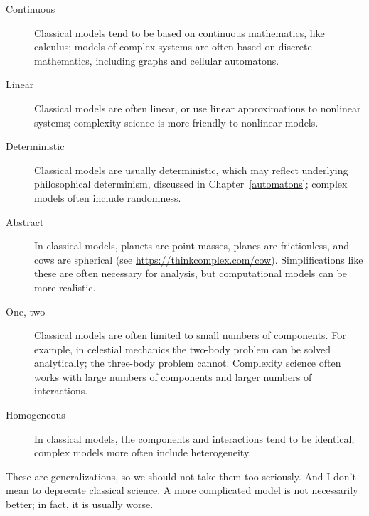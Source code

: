 \documentclass[12pt]{book}
\theoremstyle{exercise}
\newcommand{\myrightarrow}{\ensuremath \rightarrow}
\begin{document}
\begin{description}

\item[Continuous \myrightarrow~discrete] Classical models tend to be
  based on continuous mathematics, like calculus; models of complex
  systems are often based on discrete mathematics, including graphs and
  cellular automatons.


\item[Linear \myrightarrow~nonlinear] Classical models are often
  linear, or use linear approximations to nonlinear systems;
  complexity science is more friendly to nonlinear models.


\item[Deterministic \myrightarrow~stochastic] Classical models are
  usually deterministic, which may reflect underlying philosophical
  determinism, discussed in Chapter~\ref{automatons}; complex models
  often include randomness.


\item[Abstract \myrightarrow~detailed] In classical models, planets are
  point masses, planes are frictionless, and cows are
  spherical (see \url{https://thinkcomplex.com/cow}).
  Simplifications like these are often necessary for analysis,
  but computational models can be more realistic.


\item[One, two \myrightarrow~many] Classical models are often limited to
  small numbers of components.  For example, in celestial mechanics the
  two-body problem can be solved analytically; the three-body problem
  cannot.  Complexity science often works with large numbers of components and larger numbers of interactions.


\item[Homogeneous \myrightarrow~heterogeneous] In classical models, the
  components and interactions tend to be identical; complex models more often
  include heterogeneity.


\end{description}

These are generalizations, so we should not take them too seriously.
And I don't mean to deprecate classical science.  A more complicated
model is not necessarily better; in fact, it is usually worse.
\end{document}
